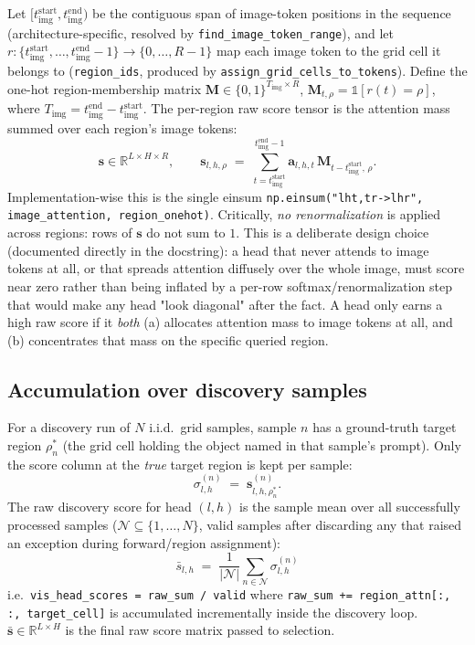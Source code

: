 Let $[t_{\text{img}}^{\text{start}}, t_{\text{img}}^{\text{end}})$ be the
contiguous span of image-token positions in the sequence (architecture-specific,
resolved by \texttt{find\_image\_token\_range}), and let
$r : \{t_{\text{img}}^{\text{start}}, \dots, t_{\text{img}}^{\text{end}}-1\}
\to \{0,\dots,R-1\}$
map each image token to the grid cell it belongs to (\texttt{region\_ids},
produced by \texttt{assign\_grid\_cells\_to\_tokens}). Define the one-hot
region-membership matrix $\mathbf{M} \in \{0,1\}^{T_{\text{img}} \times R}$,
$\mathbf{M}_{t,\rho} = \mathbb{1}[r(t) = \rho]$, where
$T_{\text{img}} = t_{\text{img}}^{\text{end}} - t_{\text{img}}^{\text{start}}$.
The per-region raw score tensor is the attention mass summed over each
region's image tokens:
\[
  \mathbf{s} \in \mathbb{R}^{L \times H \times R},
  \qquad
  \mathbf{s}_{l,h,\rho}
    \;=\; \sum_{t = t_{\text{img}}^{\text{start}}}^{t_{\text{img}}^{\text{end}}-1}
          \mathbf{a}_{l,h,t}\, \mathbf{M}_{t - t_{\text{img}}^{\text{start}},\,\rho} .
\]
Implementation-wise this is the single einsum
\texttt{np.einsum("lht,tr->lhr", image\_attention, region\_onehot)}. Critically,
\emph{no renormalization} is applied across regions: rows of $\mathbf{s}$ do
not sum to $1$. This is a deliberate design choice (documented directly in the
docstring): a head that never attends to image tokens at all, or that spreads
attention diffusely over the whole image, must score near zero rather than
being inflated by a per-row softmax/renormalization step that would make any
head "look diagonal" after the fact. A head only earns a high raw score if it
\emph{both} (a) allocates attention mass to image tokens at all, and (b)
concentrates that mass on the specific queried region.

\subsection{Accumulation over discovery samples}

For a discovery run of $N$ i.i.d.\ grid samples, sample $n$ has a
ground-truth target region $\rho^{*}_n$ (the grid cell holding the object
named in that sample's prompt). Only the score column at the \emph{true}
target region is kept per sample:
\[
  \sigma^{(n)}_{l,h} \;=\; \mathbf{s}^{(n)}_{l,h,\rho^{*}_n}.
\]
The raw discovery score for head $(l,h)$ is the sample mean over all
successfully processed samples ($\mathcal{N} \subseteq \{1,\dots,N\}$, valid
samples after discarding any that raised an exception during forward/region
assignment):
\[
  \boxed{\;
  \bar{s}_{l,h} \;=\; \frac{1}{|\mathcal{N}|}\sum_{n \in \mathcal{N}} \sigma^{(n)}_{l,h}
  \;}
\]
i.e.\ \texttt{vis\_head\_scores = raw\_sum / valid} where
\texttt{raw\_sum += region\_attn[:, :, target\_cell]} is accumulated
incrementally inside the discovery loop. $\bar{\mathbf{s}} \in \mathbb{R}^{L
\times H}$ is the final raw score matrix passed to selection.

